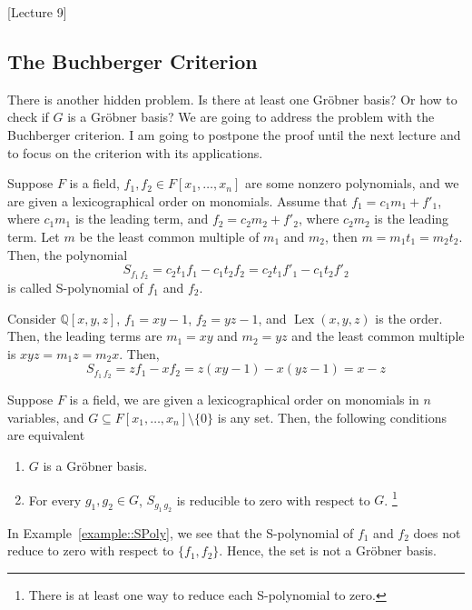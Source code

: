 [Lecture 9]


\subsection{The Buchberger Criterion}

There is another hidden problem.
Is there at least one Gr\"obner basis?
Or how to check if $G$ is a Gr\"obner basis?
We are going to address the problem with the Buchberger criterion.
I am going to postpone the proof until the next lecture and to focus on the criterion with its applications.

\begin{definition}
Suppose $F$ is a field, $f_1,f_2\in F[x_1,\ldots,x_n]$ are some nonzero polynomials, and we are given a lexicographical order on monomials.
Assume that $f_1 = c_1 m_1 + f'_1$, where $c_1m_1$ is the leading term, and $f_2 = c_2 m_2 + f'_2$, where $c_2m_2$ is the leading term.
Let $m$ be the least common multiple of $m_1$ and $m_2$, then $m = m_1 t_1 = m_2 t_2$.
Then, the polynomial
\[
S_{f_1\,f_2} = c_2t_1 f_1 - c_1 t_2 f_2 = c_2t_1 f'_1 - c_1 t_2 f'_2
\]
is called S-polynomial of $f_1$ and $f_2$.
\end{definition}


\begin{example}
\label{example::SPoly}
Consider $\mathbb Q[x, y, z]$, $f_1 = xy - 1$, $f_2 = yz - 1$, and $\operatorname{Lex}(x, y, z)$ is the order.
Then, the leading terms are $m_1 = xy$ and $m_2 = yz$ and the least common multiple is $xyz = m_1 z = m_2 x$.
 Then,
\[
S_{f_1\,f_2} = z f_1 - x f_2 = z(xy - 1) - x(yz - 1) = x-z
\]
\end{example}


\begin{claim}
Suppose $F$ is a field, we are given a lexicographical order on monomials in $n$ variables, and $G\subseteq F[x_1,\ldots,x_n]\setminus\{0\}$ is any set.
Then, the following conditions are equivalent
\begin{enumerate}
\item $G$ is a Gr\"obner basis.

\item For every $g_1,g_2\in G$, $S_{g_1\,g_2}$ is reducible to zero with respect to $G$.%
\footnote{There is at least one way to reduce each S-polynomial to zero.}
\end{enumerate}
\end{claim}

\begin{remark}
In Example~\ref{example::SPoly}, we see that the S-polynomial of $f_1$ and $f_2$ does not reduce to zero with respect to $\{f_1, f_2\}$.
Hence, the set is not a Gr\"obner basis.
\end{remark}


